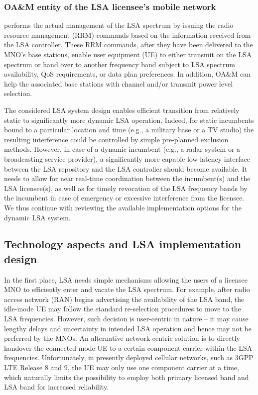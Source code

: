 \documentclass[journal]{IEEEtran}
\begin{document}
\subsubsection{OA\&M entity of the LSA licensee's mobile network} performs the actual management of the LSA spectrum by issuing the radio resource management (RRM) commands based on the information received from the LSA controller. These RRM commands, after they have been delivered to the MNO's base stations, enable user equipment (UE) to either transmit on the LSA spectrum or hand over to another frequency band subject to LSA spectrum availability, QoS requirements, or data plan preferences. In addition, OA\&M can help the associated base stations with channel and/or transmit power level selection. 

The considered LSA system design enables efficient transition from relatively static to significantly more dynamic LSA operation. Indeed, for static incumbents bound to a particular location and time (e.g., a military base or a TV studio) the resulting interference could be controlled by simple pre-planned exclusion methods. However, in case of a dynamic incumbent (e.g., a radar system or a broadcasting service provider), a significantly more capable low-latency interface between the LSA repository and the LSA controller should become available. It needs to allow for near real-time coordination between the incumbent(s) and the LSA licensee(s), as well as for timely revocation of the LSA frequency bands by the incumbent in case of emergency or excessive interference from the licensee. We thus continue with reviewing the available implementation options for the dynamic LSA system.

\subsection{Technology aspects and LSA implementation design} 

In the first place, LSA needs simple mechanisms allowing the users of a licensee MNO to efficiently enter and vacate the LSA spectrum. For example, after radio access network (RAN) begins advertising the availability of the LSA band, the idle-mode UE may follow the standard re-selection procedures to move to the LSA frequencies. However, such decision is user-centric in nature -- it may cause lengthy delays and uncertainty in intended LSA operation and hence may not be preferred by the MNOs. An alternative network-centric solution is to directly handover the connected-mode UE to a certain component carrier within the LSA frequencies. Unfortunately, in presently deployed cellular networks, such as 3GPP LTE Release 8 and 9, the UE may only use one component carrier at a time, which naturally limits the possibility to employ both primary licensed band and LSA band for increased reliability. 
\end{document}
